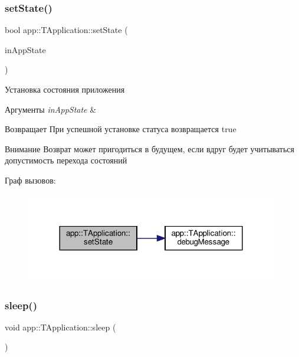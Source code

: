 \subsubsection{\texorpdfstring{set\+State()}{setState()}}
{\footnotesize\ttfamily bool app\+::\+T\+Application\+::set\+State (\begin{DoxyParamCaption}\item[{\hyperlink{group___xD0_x9F_xD0_xB5_xD1_x80_xD0_xB5_xD1_x87_xD0_xB8_xD1_x81_xD0_xBB_xD0_xB5_xD0_xBD_xD0_xB8_xD1_x8F_ga290e8080c661e52c2f685fd4af148acf}{app\+::app\+State}}]{in\+App\+State }\end{DoxyParamCaption})}



Установка состояния приложения 


\begin{DoxyParams}{Аргументы}
{\em in\+App\+State} & \\
\hline
\end{DoxyParams}
\begin{DoxyReturn}{Возвращает}
При успешной установке статуса возвращается true 
\end{DoxyReturn}
\begin{DoxyAttention}{Внимание}
Возврат может пригодиться в будущем, если вдруг будет учитываться допустимость перехода состояний 
\end{DoxyAttention}
Граф вызовов\+:\nopagebreak
\begin{figure}[H]
\begin{center}
\leavevmode
\includegraphics[width=312pt]{classapp_1_1_t_application_a3df1835103a3ba338821c27ad05f9f8d_cgraph}
\end{center}
\end{figure}
\mbox{\label{classapp_1_1_t_application_ab44dd5aa2afe1d66b2588e908bfad4d0}} 
\subsubsection{\texorpdfstring{sleep()}{sleep()}}
{\footnotesize\ttfamily void app\+::\+T\+Application\+::sleep (\begin{DoxyParamCaption}{ }\end{DoxyParamCaption})}



